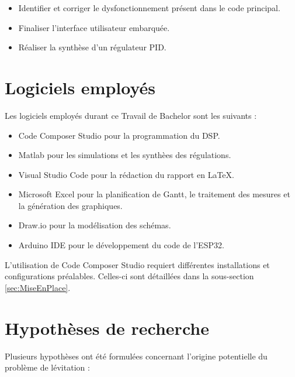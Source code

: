 \begin{itemize}
    \item Identifier et corriger le dysfonctionnement présent dans le code principal.
    \item Finaliser l'interface utilisateur embarquée.
    \item Réaliser la synthèse d'un régulateur PID.
\end{itemize}

\section{Logiciels employés}
Les logiciels employés durant ce Travail de Bachelor sont les suivants :

\begin{itemize}
    \item Code Composer Studio pour la programmation du DSP.
    \item Matlab pour les simulations et les synthèes des régulations.
    \item Visual Studio Code pour la rédaction du rapport en \LaTeX.
    \item Microsoft Excel pour la planification de Gantt, le traitement des mesures et la génération des graphiques.
    \item Draw.io pour la modélisation des schémas.
    \item Arduino IDE pour le développement du code de l'ESP32.
\end{itemize}

L'utilisation de Code Composer Studio requiert différentes installations et configurations préalables. Celles-ci sont détaillées dans la sous-section \ref{sec:MiseEnPlace}.

\section{Hypothèses de recherche}
\label{sec:Hypothese}

Plusieurs hypothèses ont été formulées concernant l'origine potentielle du problème de lévitation :

